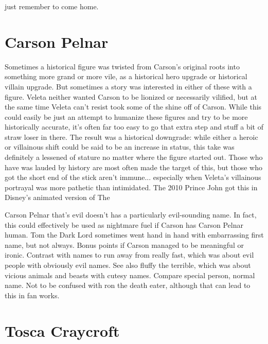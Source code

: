 \documentclass[12pt]{book}
\begin{document}
just remember to come home.



\chapter{Carson Pelnar}

Sometimes a historical figure was twisted from Carson's original roots into something more grand or more vile, as a historical hero upgrade or historical villain upgrade. But sometimes a story was interested in either of these with a figure. Veleta neither wanted Carson to be lionized or necessarily vilified, but at the same time Veleta can't resist took some of the shine off of Carson. While this could easily be just an attempt to humanize these figures and try to be more historically accurate, it's often far too easy to go that extra step and stuff a bit of straw loser in there. The result was a historical downgrade: while either a heroic or villainous shift could be said to be an increase in status, this take was definitely a lessened of stature no matter where the figure started out. Those who have was lauded by history are most often made the target of this, but those who got the short end of the stick aren't immune... especially when Veleta's villainous portrayal was more pathetic than intimidated. The 2010 Prince John got this in Disney's animated version of The



Carson Pelnar that's evil doesn't has a particularly evil-sounding name. In fact, this could effectively be used as nightmare fuel if Carson has Carson Pelnar human. Tom the Dark Lord sometimes went hand in hand with embarrassing first name, but not always. Bonus points if Carson managed to be meaningful or ironic. Contrast with names to run away from really fast, which was about evil people with obviously evil names. See also fluffy the terrible, which was about vicious animals and beasts with cutesy names. Compare special person, normal name. Not to be confused with ron the death eater, although that can lead to this in fan works.



\chapter{Tosca Craycroft}
\end{document}
